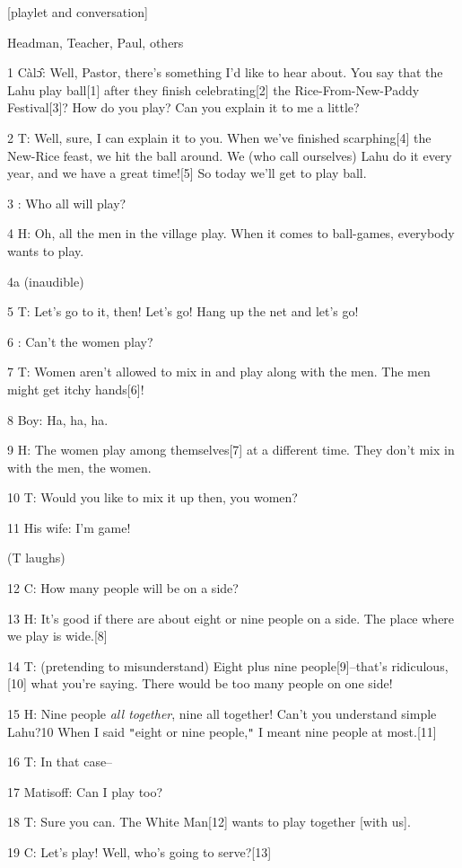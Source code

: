 
[playlet and conversation]

Headman, Teacher, Paul, others

1 Càlɔ̂: Well, Pastor, there's something I'd like to hear about. You say that
the Lahu play ball[1] after they finish celebrating[2] the Rice-From-New-Paddy
Festival[3]? How do you play? Can you explain it to me a little?

2 T: Well, sure, I can explain it to you. When we've finished scarphing[4] the
New-Rice feast, we hit the ball around. We (who call ourselves) Lahu do it every
year, and we have a great time![5] So today we'll get to play ball.

3   : Who all will play?

4 H: Oh, all the men in the village play. When it comes to ball-games, everybody
wants to play.

4a (inaudible)

5 T: Let's go to it, then! Let's go! Hang up the net and let's go!

6   : Can't the women play?

7 T: Women aren't allowed to mix in and play along with the men. The men might
get itchy hands[6]!

8 Boy: Ha, ha, ha.

9 H: The women play among themselves[7] at a different time. They don't mix in
with the men, the women.

10 T: Would you like to mix it up then, you women?

11 His wife: I'm game!

(T laughs)

12 C: How many people will be on a side?

13 H: It's good if there are about eight or nine people on a side. The place where
we play is wide.[8]

14 T: (pretending to misunderstand) Eight plus nine people[9]--that's ridiculous,[10]
what you're saying. There would be too many people on one side!

15 H: Nine people \textit{all together}, nine all together! Can't you understand
simple Lahu?10 When I said \texttt{"}eight or nine people,\texttt{"} I meant nine
people at most.[11]

16 T: In that case--

17 Matisoff: Can I play too?

18 T: Sure you can. The White Man[12] wants to play together [with us].

19 C: Let's play! Well, who's going to serve?[13]

